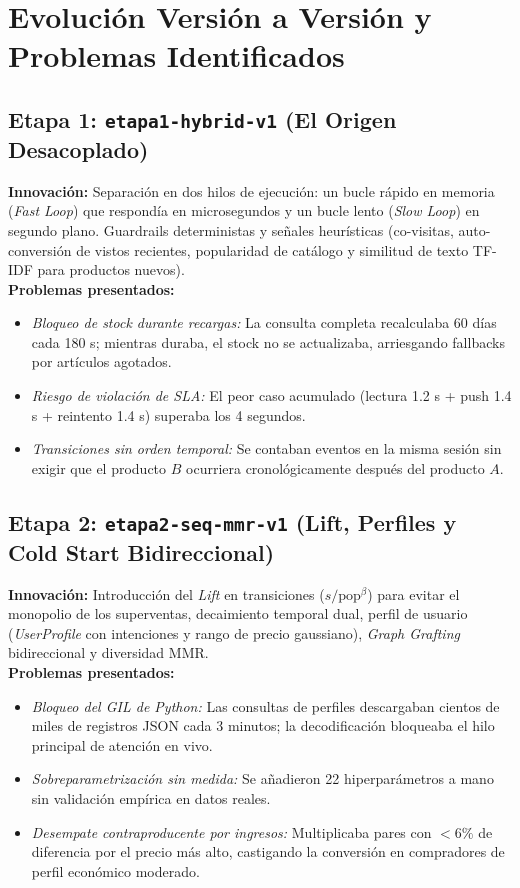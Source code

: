 \documentclass[11pt,a4paper]{article}
\begin{document}
\section{Evolución Versión a Versión y Problemas Identificados}

\subsection{Etapa 1: \texttt{etapa1-hybrid-v1} (El Origen Desacoplado)}
\textbf{Innovación:} Separación en dos hilos de ejecución: un bucle rápido en memoria (\textit{Fast Loop}) que respondía en microsegundos y un bucle lento (\textit{Slow Loop}) en segundo plano. Guardrails deterministas y señales heurísticas (co-visitas, auto-conversión de vistos recientes, popularidad de catálogo y similitud de texto TF-IDF para productos nuevos).\\
\textbf{Problemas presentados:}
\begin{itemize}[noitemsep]
    \item \textit{Bloqueo de stock durante recargas:} La consulta completa recalculaba 60 días cada 180 s; mientras duraba, el stock no se actualizaba, arriesgando fallbacks por artículos agotados.
    \item \textit{Riesgo de violación de SLA:} El peor caso acumulado (lectura 1.2 s + push 1.4 s + reintento 1.4 s) superaba los 4 segundos.
    \item \textit{Transiciones sin orden temporal:} Se contaban eventos en la misma sesión sin exigir que el producto $B$ ocurriera cronológicamente después del producto $A$.
\end{itemize}

\subsection{Etapa 2: \texttt{etapa2-seq-mmr-v1} (Lift, Perfiles y Cold Start Bidireccional)}
\textbf{Innovación:} Introducción del \textit{Lift} en transiciones ($s / \text{pop}^\beta$) para evitar el monopolio de los superventas, decaimiento temporal dual, perfil de usuario (\textit{UserProfile} con intenciones y rango de precio gaussiano), \textit{Graph Grafting} bidireccional y diversidad MMR.\\
\textbf{Problemas presentados:}
\begin{itemize}[noitemsep]
    \item \textit{Bloqueo del GIL de Python:} Las consultas de perfiles descargaban cientos de miles de registros JSON cada 3 minutos; la decodificación bloqueaba el hilo principal de atención en vivo.
    \item \textit{Sobreparametrización sin medida:} Se añadieron 22 hiperparámetros a mano sin validación empírica en datos reales.
    \item \textit{Desempate contraproducente por ingresos:} Multiplicaba pares con $<6\%$ de diferencia por el precio más alto, castigando la conversión en compradores de perfil económico moderado.
\end{itemize}
\end{document}
